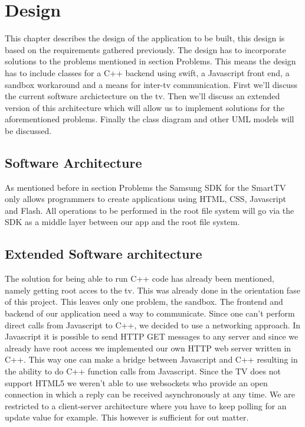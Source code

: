 \chapter{Design}
This chapter describes the design of the application to be built, this design is based on the requirements gathered previously. The design has to incorporate solutions to the problems mentioned in section Problems. %
This means the design has to include classes for a C++ backend using swift, a Javascript front end, a sandbox workaround and a means for inter-tv communication. First we'll discuss the current software archictecture on the tv. Then we'll discuss an extended version of this architecture which will allow us to implement solutions for the aforementioned problems. Finally the class diagram and other UML models will be discussed.

\section{Software Architecture}
As mentioned before in section Problems %
the Samsung SDK for the SmartTV only allows programmers to create applications using HTML, CSS, Javascript and Flash.
All operations to be performed in the root file system will go via the SDK as a middle layer between our app and the root file system.

\section{Extended Software architecture}
The solution for being able to run C++ code has already been mentioned, namely getting root acces to the tv. This was already done in the orientation fase of this project. This leaves only one problem, the sandbox. The frontend and backend of our application need a way to communicate. Since one can't perform direct calls from Javascript to C++, we decided to use a networking approach. In Javascript it is possible to send HTTP GET messages to any server and since we already have root access we implemented our own HTTP web server written in C++. This way one can make a bridge between Javascript and C++ resulting in the ability to do C++ function calls from Javascript. Since the TV does not support HTML5 we weren't able to use websockets who provide an open connection in which a reply can be received asynchronously at any time. We are restricted to a client-server architecture where you have to keep polling for an update value for example. This however is sufficient for out matter. %

